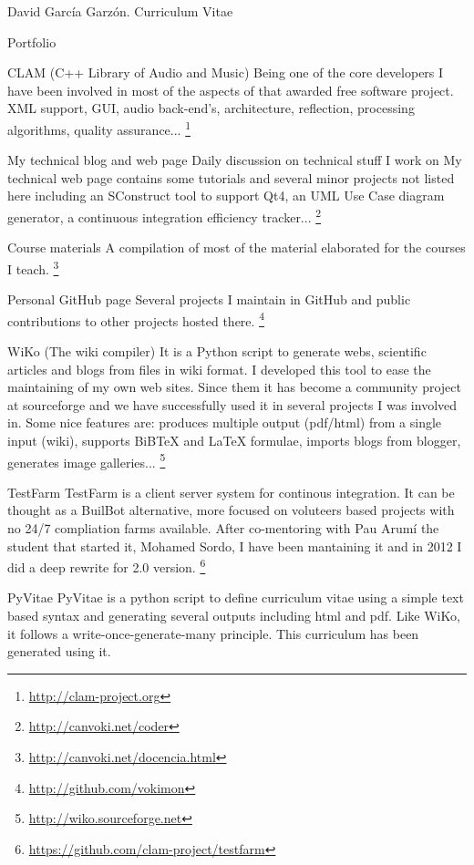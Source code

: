 \documentclass{article}
\begin{document}
\begin{cv}{David García Garzón. Curriculum Vitae}
\begin{cvlist}{Portfolio}
\item[CLAM (C++ Library of Audio and Music)]
Being one of the core developers I have been involved in most of the aspects of that awarded free software project. XML support, GUI, audio back-end's, architecture, reflection, processing algorithms, quality assurance...
\footnote{\href{http://clam-project.org}{http://clam-project.org}}
\item[My technical blog and web page]
Daily discussion on technical stuff I work on My technical web page contains some tutorials and several minor projects not listed here including an SConstruct tool to support Qt4, an UML Use Case diagram generator, a continuous integration efficiency tracker...
\footnote{\href{http://canvoki.net/coder}{http://canvoki.net/coder}}
\item[Course materials]
A compilation of most of the material elaborated for the courses I teach.
\footnote{\href{http://canvoki.net/docencia.html}{http://canvoki.net/docencia.html}}
\item[Personal GitHub page]
Several projects I maintain in GitHub and public contributions to other projects hosted there.
\footnote{\href{http://github.com/vokimon}{http://github.com/vokimon}}
\item[WiKo (The wiki compiler)]
It is a Python script to generate webs, scientific articles and blogs from files in wiki format.  I developed this tool to ease the maintaining of my own web sites. Since them it has become a community project at sourceforge and we have successfully used it in several projects I was involved in. Some nice features are: produces multiple output (pdf/html) from a single input (wiki), supports BiBTeX and LaTeX formulae, imports blogs from blogger, generates image galleries...
\footnote{\href{http://wiko.sourceforge.net}{http://wiko.sourceforge.net}}
\item[TestFarm]
TestFarm is a client server system for continous integration. It can be thought as a BuilBot alternative, more focused on voluteers based projects with no 24/7 compliation farms available. After co-mentoring with Pau Arumí the student that started it, Mohamed Sordo, I have been mantaining it and in 2012 I did a deep rewrite for 2.0 version.
\footnote{\href{https://github.com/clam-project/testfarm}{https://github.com/clam-project/testfarm}}
\item[PyVitae]
PyVitae is a python script to define curriculum vitae using a simple  text based syntax and generating several outputs including html and pdf. Like WiKo, it follows a write-once-generate-many principle. This curriculum has been generated using it.

\end{cvlist}
\end{cv}
\end{document}
